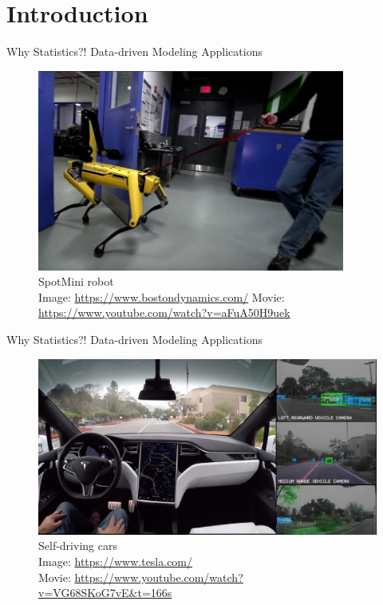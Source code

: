 \section{Introduction}

\begin{frame}{Why Statistics?! Data-driven Modeling Applications}
    \begin{figure}
        \includegraphics[width=0.9\textwidth]{gfx/web/boston-dynamics}\\
        SpotMini robot\\
        {\tiny Image: \href{https://www.bostondynamics.com/}{https://www.bostondynamics.com/}}
        {\tiny Movie: \url{https://www.youtube.com/watch?v=aFuA50H9uek}}
    \end{figure}

\end{frame}

\begin{frame}{Why Statistics?! Data-driven Modeling Applications}
    \begin{figure}
        \includegraphics[width=\textwidth]{gfx/web/tesla-autopilot}\\
        Self-driving cars\\
        {\tiny Image: \href{https://www.tesla.com/}{https://www.tesla.com/}}\\
        {\tiny Movie: \url{https://www.youtube.com/watch?v=VG68SKoG7vE&t=166s}}
    \end{figure}
\end{frame}


